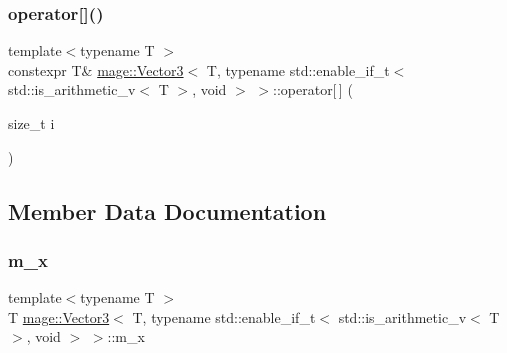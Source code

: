 \subsubsection{\texorpdfstring{operator[]()}{operator[]()}\hspace{0.1cm}{\footnotesize\ttfamily [2/2]}}
{\footnotesize\ttfamily template$<$typename T $>$ \\
constexpr T\& \hyperlink{structmage_1_1_vector3}{mage\+::\+Vector3}$<$ T, typename std\+::enable\+\_\+if\+\_\+t$<$ std\+::is\+\_\+arithmetic\+\_\+v$<$ T $>$, void $>$ $>$\+::operator\mbox{[}$\,$\mbox{]} (\begin{DoxyParamCaption}\item[{size\+\_\+t}]{i }\end{DoxyParamCaption})\hspace{0.3cm}{\ttfamily [noexcept]}}



\subsection{Member Data Documentation}
\hypertarget{structmage_1_1_vector3_3_01_t_00_01typename_01std_1_1enable__if__t_3_01std_1_1is__arithmetic__v_3_01_t_01_4_00_01void_01_4_01_4_ab495c6012997584b577b5cc55299c981}{}\label{structmage_1_1_vector3_3_01_t_00_01typename_01std_1_1enable__if__t_3_01std_1_1is__arithmetic__v_3_01_t_01_4_00_01void_01_4_01_4_ab495c6012997584b577b5cc55299c981} 
\subsubsection{\texorpdfstring{m\+\_\+x}{m\_x}}
{\footnotesize\ttfamily template$<$typename T $>$ \\
T \hyperlink{structmage_1_1_vector3}{mage\+::\+Vector3}$<$ T, typename std\+::enable\+\_\+if\+\_\+t$<$ std\+::is\+\_\+arithmetic\+\_\+v$<$ T $>$, void $>$ $>$\+::m\+\_\+x}

